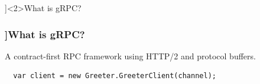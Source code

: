\QuestionSlide[\CategoryBadge[LinqColor!20]{gRPC}]<2>{What is gRPC?}
\begin{frame}[fragile]
  \frametitle{\AnswerTitle[\CategoryBadge[LinqColor!20]{gRPC}]{What is gRPC?}}
  {\footnotesize
  A contract-first RPC framework using HTTP/2 and protocol buffers.
  }
  \begin{verbatim}
  var client = new Greeter.GreeterClient(channel);
  \end{verbatim}
\end{frame}
